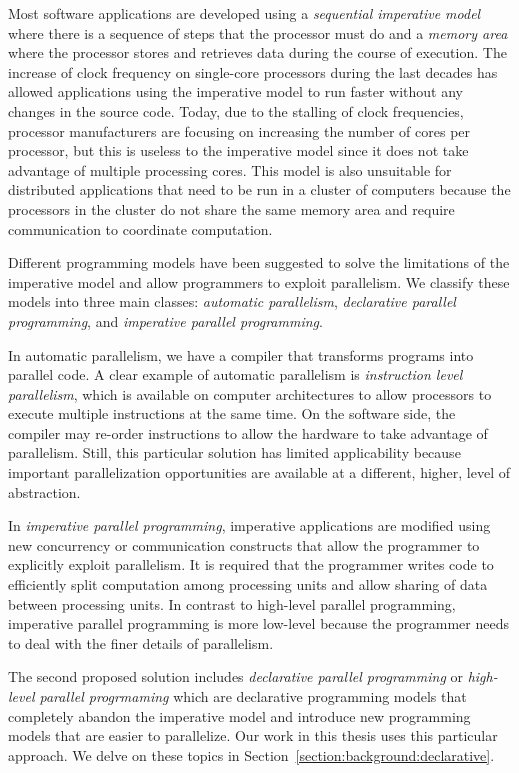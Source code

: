 Most software applications are developed using a \emph{sequential imperative
model} where there is a sequence of steps that the processor must do and a
\emph{memory area} where the processor stores and retrieves data during the
course of execution.  The increase of clock frequency on single-core processors
during the last decades has allowed applications using the imperative model to
run faster without any changes in the source code. Today, due to the stalling of
clock frequencies, processor manufacturers are focusing on increasing the number
of cores per processor, but this is useless to the imperative model since it
does not take advantage of multiple processing cores. This model is also
unsuitable for distributed applications that need to be run in a cluster of
computers because the processors in the cluster do not share the same memory
area and require communication to coordinate computation.

Different programming models have been suggested to solve the limitations of the
imperative model and allow programmers to exploit parallelism. We classify these
models into three main classes: \emph{automatic parallelism}, \emph{declarative
parallel programming}, and \emph{imperative parallel programming}.

In automatic parallelism, we have a compiler that transforms programs into
parallel code. A clear example of automatic parallelism is \emph{instruction
level parallelism}, which is available on computer architectures to allow
processors to execute multiple instructions at the same time. On the software
side, the compiler may re-order instructions to allow the hardware to take
advantage of parallelism.  Still, this particular solution has limited
applicability because important parallelization opportunities are available at a
different, higher, level of abstraction.

In \emph{imperative parallel programming}, imperative applications are modified
using new concurrency or communication constructs that allow the programmer to
explicitly exploit parallelism. It is required that the programmer writes code
to efficiently split computation among processing units and allow sharing of
data between processing units. In contrast to high-level parallel programming,
imperative parallel programming is more low-level because the programmer needs
to deal with the finer details of parallelism.

The second proposed solution includes \emph{declarative parallel programming} or
\emph{high-level parallel progrmaming} which are declarative programming models
that completely abandon the imperative model and introduce new programming
models that are easier to parallelize. Our work in this thesis uses this
particular approach. We delve on these topics in
Section~\ref{section:background:declarative}.

